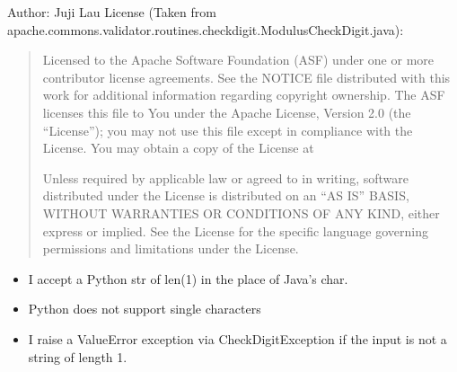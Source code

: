 \documentclass[letterpaper,10pt,english]{sphinxmanual}
\begin{document}
\sphinxAtStartPar
Author: Juji Lau
License (Taken from apache.commons.validator.routines.checkdigit.ModulusCheckDigit.java):
\begin{quote}

\sphinxAtStartPar
Licensed to the Apache Software Foundation (ASF) under one or more
contributor license agreements. See the NOTICE file distributed with
this work for additional information regarding copyright ownership.
The ASF licenses this file to You under the Apache License, Version 2.0
(the “License”); you may not use this file except in compliance with
the License. You may obtain a copy of the License at
\begin{quote}

\sphinxAtStartPar
{}
\end{quote}

\sphinxAtStartPar
Unless required by applicable law or agreed to in writing, software
distributed under the License is distributed on an “AS IS” BASIS,
WITHOUT WARRANTIES OR CONDITIONS OF ANY KIND, either express or implied.
See the License for the specific language governing permissions and
limitations under the License.
\end{quote}
\begin{description}
\begin{description}
\begin{itemize}
\item {} 
\sphinxAtStartPar
I accept a Python str of len(1) in the place of Java’s char.

\item {} 
\sphinxAtStartPar
Python does not support single characters

\item {} 
\sphinxAtStartPar
I raise a ValueError exception via CheckDigitException if the input is not a string of length 1.

\end{itemize}

\end{description}

\end{description}
\end{document}
